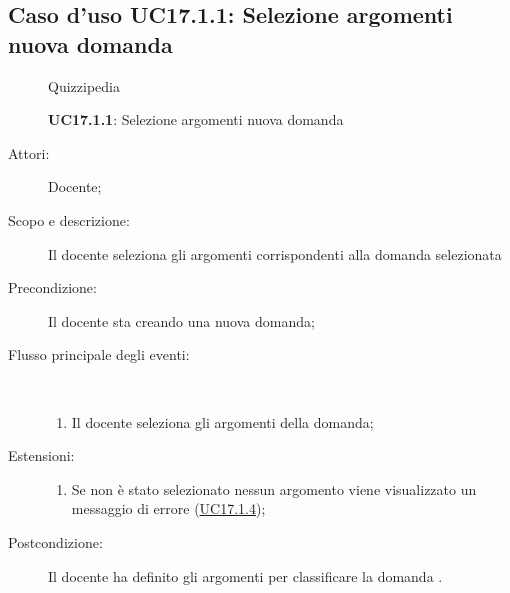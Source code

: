 \subsection{Caso d'uso UC17.1.1: Selezione argomenti nuova domanda}
\begin{figure}[H]
	\centering
	\begin{resizedtikzpicture}{\textwidth}
		\begin{umlsystem}[x=0, fill=lightgray!20]{Quizzipedia}
		\end{umlsystem}
	\end{resizedtikzpicture}
	\caption{\textbf{UC17.1.1}: Selezione argomenti nuova domanda}
	\label{UC17.1.1}
\end{figure}
\begin{description}
	\item[Attori:] Docente;
	\item[Scopo e descrizione:] Il docente seleziona gli argomenti corrispondenti alla domanda selezionata
	\item[Precondizione:] Il docente sta creando una nuova domanda;
	
	\item[Flusso principale degli eventi:] \ 
	\begin{enumerate}
		\item Il docente seleziona gli argomenti della domanda;
		
	\end{enumerate}
	\item[Estensioni:]
	\begin{enumerate}
		\item Se non è stato selezionato nessun argomento viene visualizzato un messaggio di errore (\hyperlink{UC17.1.4}{UC17.1.4});
		
	\end{enumerate}
	\item[Postcondizione:] Il docente ha definito gli argomenti per classificare la domanda
	.
\end{description}
\hypertarget{UC17.1.2}{}
